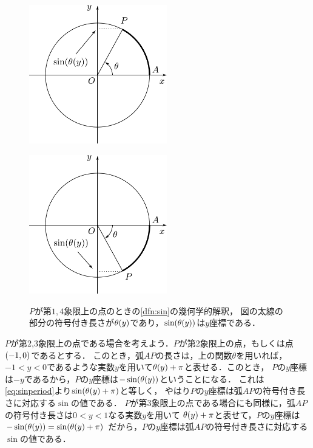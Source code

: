 \documentclass[11pt,a4paper]{ltjsarticle}
\newcommand*{\coord}[1]{\paren{#1}}
\theoremstyle{definition}
\begin{document}
\begin{figure}[htbp]
  \begin{minipage}{.45\linewidth}
    \centering
    \includegraphics[width=60mm]{fig/circle.pdf}
    \label{fig:circleposi}
  \end{minipage}
  \begin{minipage}{.45\linewidth}
    \centering
    \includegraphics[width=60mm]{fig/circlenega.pdf}
    \label{fig:circlenega}
  \end{minipage}
  \caption{$P$が第$1,4$象限上の点のときの\cref{dfn:sin}の幾何学的解釈，
  図の太線の部分の符号付き長さが$\apply{\theta}{y}$であり，$\apply{\sin}{\apply{\theta}{y}}$は$y$座標である．}
  \label{fig:circle}
\end{figure}

$P$が第2,3象限上の点である場合を考えよう．$P$が第2象限上の点，もしくは点$\coord{-1,0}$であるとする．
このとき，弧$AP$の長さは，上の関数$\theta$を用いれば，
$-1 < y < 0$であるような実数$y$を用いて$\apply{\theta}{y} + \pi$と表せる．このとき，
$P$の$y$座標は$-y$であるから，$P$の$y$座標は$- \apply{\sin}{\apply{\theta}{y}}$ということになる．
これは\cref{eq:sinperiod}より$\apply{\sin}{\apply{\theta}{y} + \pi}$と等しく，
やはり$P$の$y$座標は弧$AP$の符号付き長さに対応する$\sin$の値である．
$P$が第3象限上の点である場合にも同様に，弧$AP$の符号付き長さは$0 < y < 1$なる実数$y$を用いて
$\apply{\theta}{y} + \pi$と表せて，$P$の$y$座標は$- \apply{\sin}{\apply{\theta}{y}} = \apply{\sin}{\apply{\theta}{y} + \pi}$
だから，$P$の$y$座標は弧$AP$の符号付き長さに対応する$\sin$の値である．
\end{document}
